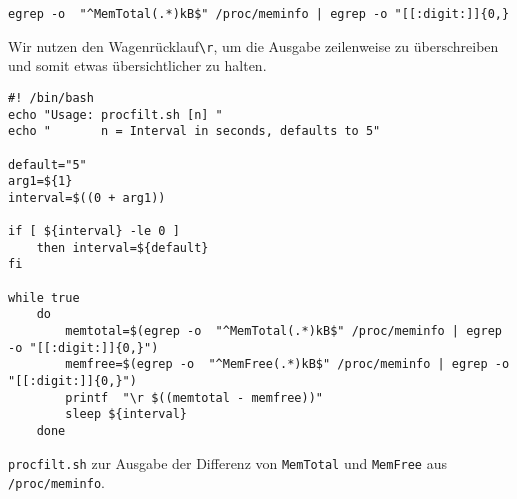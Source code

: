 \begin{verbatim}
egrep -o  "^MemTotal(.*)kB$" /proc/meminfo | egrep -o "[[:digit:]]{0,}
\end{verbatim}

\noindent
Wir nutzen den Wagenrücklauf\texttt{\textbackslash r}, um die Ausgabe zeilenweise zu überschreiben und somit etwas übersichtlicher zu halten.

\begin{listing}[H]
\begin{verbatim}
#! /bin/bash
echo "Usage: procfilt.sh [n] "
echo "       n = Interval in seconds, defaults to 5"

default="5"
arg1=${1}
interval=$((0 + arg1))

if [ ${interval} -le 0 ]
    then interval=${default}
fi

while true
    do
        memtotal=$(egrep -o  "^MemTotal(.*)kB$" /proc/meminfo | egrep -o "[[:digit:]]{0,}")
        memfree=$(egrep -o  "^MemFree(.*)kB$" /proc/meminfo | egrep -o "[[:digit:]]{0,}")
        printf  "\r $((memtotal - memfree))"
        sleep ${interval}
    done
\end{verbatim}
\caption{\texttt{procfilt.sh} zur Ausgabe der Differenz von \texttt{MemTotal} und \texttt{MemFree} aus \texttt{/proc/meminfo}.}
\label{lst:procfilt}
\end{listing}